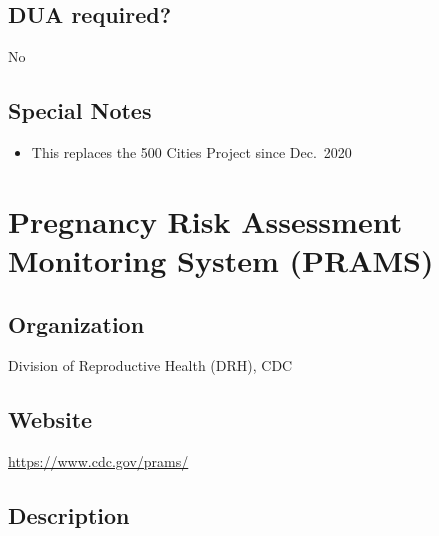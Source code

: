 \documentclass[
]{book}
\providecommand{\tightlist}{%
  \setlength{\itemsep}{0pt}\setlength{\parskip}{0pt}}
\begin{document}
\hypertarget{dua-required-72}{%
\section{DUA required?}\label{dua-required-72}}

No

\hypertarget{special-notes-72}{%
\section{Special Notes}\label{special-notes-72}}

\begin{itemize}
\tightlist
\item
  This replaces the 500 Cities Project since Dec.~2020
\end{itemize}

\mainmatter

\hypertarget{pregnancy-risk-assessment-monitoring-system-prams}{%
\chapter{Pregnancy Risk Assessment Monitoring System (PRAMS)}\label{pregnancy-risk-assessment-monitoring-system-prams}}

\hypertarget{organization-73}{%
\section{Organization}\label{organization-73}}

Division of Reproductive Health (DRH), CDC

\hypertarget{website-73}{%
\section{Website}\label{website-73}}

\url{https://www.cdc.gov/prams/}

\hypertarget{description-73}{%
\section{Description}\label{description-73}}
\end{document}
